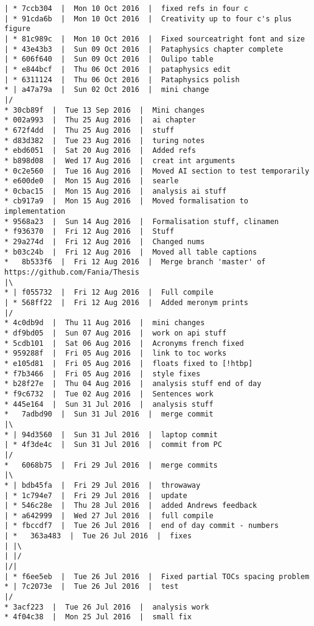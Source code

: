 \begin{verbatim}
| * 7ccb304  |  Mon 10 Oct 2016  |  fixed refs in four c
| * 91cda6b  |  Mon 10 Oct 2016  |  Creativity up to four c's plus figure
| * 81c989c  |  Mon 10 Oct 2016  |  Fixed sourceatright font and size
| * 43e43b3  |  Sun 09 Oct 2016  |  Pataphysics chapter complete
| * 606f640  |  Sun 09 Oct 2016  |  Oulipo table
| * e844bcf  |  Thu 06 Oct 2016  |  pataphysics edit
| * 6311124  |  Thu 06 Oct 2016  |  Pataphysics polish
* | a47a79a  |  Sun 02 Oct 2016  |  mini change
|/  
* 30cb89f  |  Tue 13 Sep 2016  |  Mini changes
* 002a993  |  Thu 25 Aug 2016  |  ai chapter
* 672f4dd  |  Thu 25 Aug 2016  |  stuff
* d83d382  |  Tue 23 Aug 2016  |  turing notes
* ebd6051  |  Sat 20 Aug 2016  |  Added refs
* b898d08  |  Wed 17 Aug 2016  |  creat int arguments
* 0c2e560  |  Tue 16 Aug 2016  |  Moved AI section to test temporarily
* e600de0  |  Mon 15 Aug 2016  |  searle
* 0cbac15  |  Mon 15 Aug 2016  |  analysis ai stuff
* cb917a9  |  Mon 15 Aug 2016  |  Moved formalisation to implementation
* 9568a23  |  Sun 14 Aug 2016  |  Formalisation stuff, clinamen
* f936370  |  Fri 12 Aug 2016  |  Stuff
* 29a274d  |  Fri 12 Aug 2016  |  Changed nums
* b03c24b  |  Fri 12 Aug 2016  |  Moved all table captions
*   8b533f6  |  Fri 12 Aug 2016  |  Merge branch 'master' of https://github.com/Fania/Thesis
|\  
* | f055732  |  Fri 12 Aug 2016  |  Full compile
| * 568ff22  |  Fri 12 Aug 2016  |  Added meronym prints
|/  
* 4c0db9d  |  Thu 11 Aug 2016  |  mini changes
* df9bd05  |  Sun 07 Aug 2016  |  work on api stuff
* 5cdb101  |  Sat 06 Aug 2016  |  Acronyms french fixed
* 959288f  |  Fri 05 Aug 2016  |  link to toc works
* e105d81  |  Fri 05 Aug 2016  |  floats fixed to [!htbp]
* f7b3466  |  Fri 05 Aug 2016  |  style fixes
* b28f27e  |  Thu 04 Aug 2016  |  analysis stuff end of day
* f9c6732  |  Tue 02 Aug 2016  |  Sentences work
* 445e164  |  Sun 31 Jul 2016  |  analysis stuff
*   7adbd90  |  Sun 31 Jul 2016  |  merge commit
|\  
* | 94d3560  |  Sun 31 Jul 2016  |  laptop commit
| * 4f3de4c  |  Sun 31 Jul 2016  |  commit from PC
|/  
*   6068b75  |  Fri 29 Jul 2016  |  merge commits
|\  
* | bdb45fa  |  Fri 29 Jul 2016  |  throwaway
| * 1c794e7  |  Fri 29 Jul 2016  |  update
| * 546c28e  |  Thu 28 Jul 2016  |  added Andrews feedback
| * a642999  |  Wed 27 Jul 2016  |  full compile
| * fbccdf7  |  Tue 26 Jul 2016  |  end of day commit - numbers
| *   363a483  |  Tue 26 Jul 2016  |  fixes
| |\  
| |/  
|/|   
| * f6ee5eb  |  Tue 26 Jul 2016  |  Fixed partial TOCs spacing problem
* | 7c2073e  |  Tue 26 Jul 2016  |  test
|/  
* 3acf223  |  Tue 26 Jul 2016  |  analysis work
* 4f04c38  |  Mon 25 Jul 2016  |  small fix

\end{verbatim}
